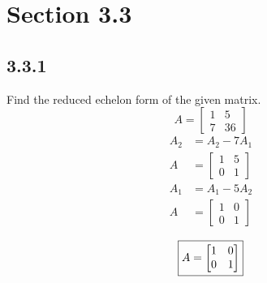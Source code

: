 \documentclass{article}
\begin{document}
\newcommand{\hr}{\par\noindent\rule{\textwidth}{0.4pt}}

\newcommand{\bc}[1]{
	\begin{equation*}
		\begin{boxed}
			{#1}
		\end{boxed}
	\end{equation*}
}

\newcommand{\cond}[2]{
	\ifmmode
		{#1} \quad {#2}
	\else
		$$ {#1} \quad {#2} $$
	\fi
}

\tableofcontents

\section{Section 3.3}

\subsection{3.3.1}
Find the reduced echelon form of the given matrix.
\begin{equation*}
	A = \begin{bmatrix}
		1 & 5 \\
		7 & 36
	\end{bmatrix}
\end{equation*}
\begin{align*}
	A_2 & = A_2 - 7A_1 \\
	A & = \begin{bmatrix}
		1 & 5 \\
		0 & 1
	\end{bmatrix}
\end{align*}
\begin{align*}
	A_1 & = A_1 - 5A_2 \\
	A & = \begin{bmatrix}
		1 & 0 \\
		0 & 1
	\end{bmatrix}
\end{align*}
\bc{
	A = \begin{bmatrix}
		1 & 0 \\
		0 & 1
	\end{bmatrix}
}
\end{document}
